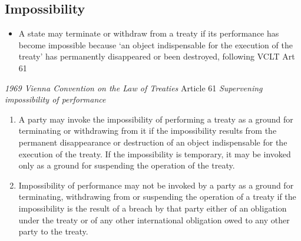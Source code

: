 \subsection{Impossibility}
\begin{itemize}
    \item A state may terminate or withdraw from a treaty if its performance has become impossible because `an object indispensable for the execution of the treaty' has permanently disappeared or been destroyed, following VCLT Art 61
\end{itemize}
\begin{conventiondetails}{\textit{1969 Vienna Convention on the Law of Treaties} Article 61}\label{VCLT Art 61}
    \flushleft
    \textit{Supervening impossibility of performance}

    \begin{enumerate}
        \item A party may invoke the impossibility of performing a treaty as a ground for terminating or withdrawing from it if the impossibility results from the permanent disappearance or destruction of an object indispensable for the execution of the treaty. If the impossibility is temporary, it may be invoked only as a ground for suspending the operation of the treaty. 
        \item Impossibility of performance may not be invoked by a party as a ground for terminating, withdrawing from or suspending the operation of a treaty if the impossibility is the result of a breach by that party either of an obligation under the treaty or of any other international obligation owed to any other party to the treaty. 
    \end{enumerate}
\end{conventiondetails}

